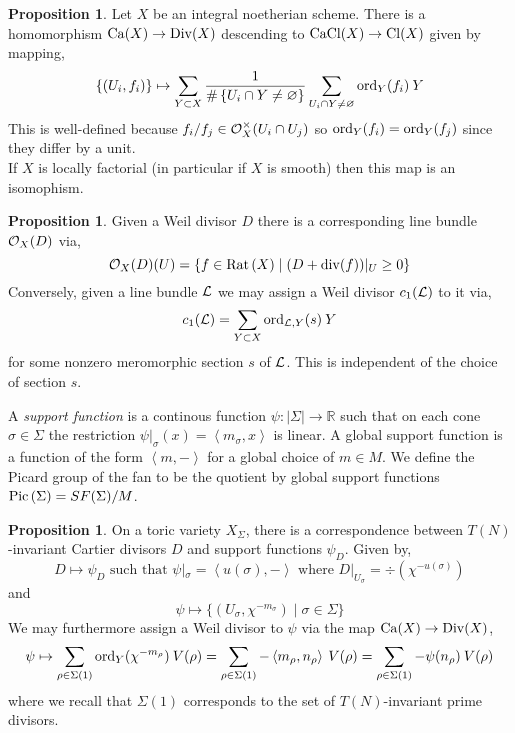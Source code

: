 \documentclass[12pt]{extarticle}
\newcommand{\R}{\mathbb{R}}
\theoremstyle{definition}
\newtheorem{proposition}[theorem]{Proposition}
\newenvironment{definition}[1][Definition:]{\begin{trivlist}
\item[\hskip \labelsep {\bfseries #1}]}{\end{trivlist}}
\newcommand{\inner}[2]{\left< #1, #2 \right>}
\begin{document}
\begin{proposition}
Let $X$ be an integral noetherian scheme. There is a homomorphism $\mathrm{Ca}{(X)} \to \mathrm{Div}{(X)}$ descending to $\mathrm{CaCl}{(X)} \to \mathrm{Cl}{(X)}$ given by mapping,
\[ \{ (U_i, f_i) \} \mapsto \sum_{Y \subset X} \frac{1}{\# \left\{ U_i \cap Y \neq \varnothing \right\} }\sum_{U_i \cap Y \neq \varnothing} \mathrm{ord}_{Y}(f_i) \: Y \]
This is well-defined because $f_i / f_j \in \mathcal{O}_{X}^\times(U_i \cap U_j)$ so $\mathrm{ord}_{Y}(f_i) = \mathrm{ord}_{Y}(f_j)$ since they differ by a unit.
\bigskip\\
If $X$ is locally factorial (in particular if $X$ is smooth) then this map is an isomophism. 
\end{proposition}

\begin{proposition}
Given a Weil divisor $D$ there is a corresponding line bundle $\mathcal{O}_{X}(D)$ via,
\[ \mathcal{O}_{X}(D)(U) = \{ f \in \mathrm{Rat} \left( X \right) \mid (D + \mathrm{div}{(f)})|_U \ge 0 \} \]
Conversely, given a line bundle $\mathcal{L}$ we may assign a Weil divisor $c_1(\mathcal{L})$ to it via,
\[ c_1(\mathcal{L}) = \sum_{Y \subset X} \mathrm{ord}_{\mathcal{L}, Y}(s) \: Y \]
for some nonzero meromorphic section $s$ of $\mathcal{L}$. This is independent of the choice of section $s$. 
\end{proposition}

\begin{definition}
A \textit{support function} is a continous function $\psi : |\Sigma| \to \R$ such that on each cone $\sigma \in \Sigma$ the restriction $\psi |_\sigma(x) = \inner{m_\sigma}{x}$ is linear. A global support function is a function of the form $\inner{m}{-}$ for  a global choice of $m \in M$. We define the Picard group of the fan to be the quotient by global support functions $\mathrm{Pic}\left( \Sigma \right) = SF(\Sigma) / M$. 
\end{definition}

\begin{proposition}
On a toric variety $X_\Sigma$, there is a correspondence between $T(N)$-invariant Cartier divisors $D$ and support functions $\psi_D$. Given by,
\[ D \mapsto \psi_D \text{ such that } \psi|_\sigma = \inner{u(\sigma)}{-} \text{ where } D |_{U_\sigma} =  \div{(\chi^{-u(\sigma)})} \]
and
\[ \psi \mapsto \{ (U_\sigma, \chi^{-m_\sigma}) \mid \sigma \in \Sigma \} \] 
We may furthermore assign a Weil divisor to $\psi$ via the map $\mathrm{Ca}{(X)} \to \mathrm{Div}{(X)}$,
\[ \psi \mapsto \sum_{\rho \in \Sigma(1)} \ord_{Y}(\chi^{-m_\rho}) \: V(\rho) = \sum_{\rho \in \Sigma(1)} -\inner{m_\rho}{n_\rho} \: V(\rho) = \sum_{\rho \in \Sigma(1)} -\psi(n_\rho) \: V(\rho) \] 
where we recall that $\Sigma(1)$ corresponds to the set of $T(N)$-invariant prime divisors.
\end{proposition}
\end{document}

